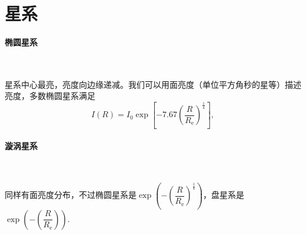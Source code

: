 \documentclass[../天体物理基础.tex]{subfiles}
\begin{document}
\section{星系}
\paragraph{椭圆星系}~{}

星系中心最亮，亮度向边缘递减。我们可以用面亮度（单位平方角秒的星等）描述亮度，多数椭圆星系满足
\begin{equation}
I\left(R\right)=I_{0}\exp\left[-7.67\left(\frac{R}{R_{\text{e}}}\right)^{\frac14}\right],
\end{equation}

\paragraph{漩涡星系}~{}


同样有面亮度分布，不过椭圆星系是$\exp\left(-\left(\dfrac{R}{R_{\text{e}}}\right)^{\frac14}\right)$，盘星系是$\exp\left(-\left(\dfrac{R}{R_{\text{e}}}\right)\right)$.


\printbibliography
\end{document}
